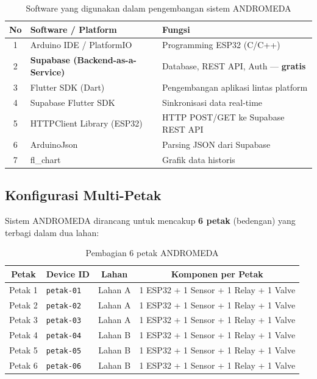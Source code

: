 \documentclass[12pt,a4paper,oneside]{report}
\begin{document}
\begin{table}[H]
\centering
\caption{Software yang digunakan dalam pengembangan sistem ANDROMEDA}
\label{tab:software}
\begin{tabularx}{\textwidth}{c X X}
\toprule
\textbf{No} & \textbf{Software / Platform} & \textbf{Fungsi} \\
\midrule
1 & Arduino IDE / PlatformIO & Programming ESP32 (C/C++) \\
2 & \textbf{Supabase (Backend-as-a-Service)} & Database, REST API, Auth — \textbf{gratis} \\
3 & Flutter SDK (Dart) & Pengembangan aplikasi lintas platform \\
4 & Supabase Flutter SDK & Sinkronisasi data real-time \\
5 & HTTPClient Library (ESP32) & HTTP POST/GET ke Supabase REST API \\
6 & ArduinoJson & Parsing JSON dari Supabase \\
7 & fl\_chart & Grafik data historis \\
\bottomrule
\end{tabularx}
\end{table}

\subsection{Konfigurasi Multi-Petak}

Sistem ANDROMEDA dirancang untuk mencakup \textbf{6 petak} (bedengan) yang terbagi dalam dua lahan:

\begin{table}[H]
\centering
\caption{Pembagian 6 petak ANDROMEDA}
\label{tab:multi-petak}
\begin{tabularx}{\textwidth}{c X c c}
\toprule
\textbf{Petak} & \textbf{Device ID} & \textbf{Lahan} & \textbf{Komponen per Petak} \\
\midrule
Petak 1 & \texttt{petak-01} & Lahan A & 1 ESP32 + 1 Sensor + 1 Relay + 1 Valve \\
Petak 2 & \texttt{petak-02} & Lahan A & 1 ESP32 + 1 Sensor + 1 Relay + 1 Valve \\
Petak 3 & \texttt{petak-03} & Lahan A & 1 ESP32 + 1 Sensor + 1 Relay + 1 Valve \\
Petak 4 & \texttt{petak-04} & Lahan B & 1 ESP32 + 1 Sensor + 1 Relay + 1 Valve \\
Petak 5 & \texttt{petak-05} & Lahan B & 1 ESP32 + 1 Sensor + 1 Relay + 1 Valve \\
Petak 6 & \texttt{petak-06} & Lahan B & 1 ESP32 + 1 Sensor + 1 Relay + 1 Valve \\
\bottomrule
\end{tabularx}
\end{table}
\end{document}
